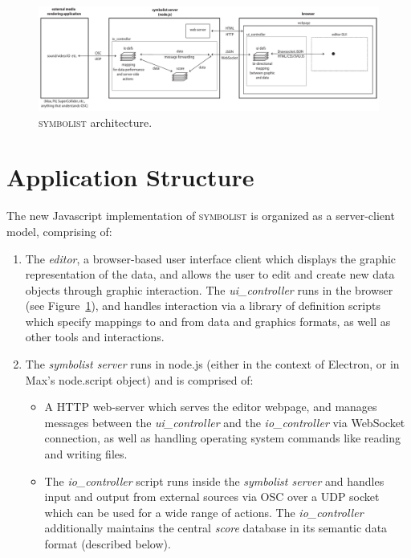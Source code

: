 \documentclass{article}
\def\symbolist{\textsc{symbolist}\xspace}
\def\uicontroller{\textit{ui\_controller}\xspace}
\def\iocontroller{\textit{io\_controller}\xspace}
\begin{document}
%


\begin{figure}[ht!]
\centering
\includegraphics[width=2\columnwidth]{symbolist-architecture2.pdf}
\caption{ \symbolist architecture.
\label{fig:architecture}}
\end{figure}

\section{Application Structure}\label{sec:application_structure}

The new Javascript implementation of \symbolist is organized as a server-client model, comprising of:

\begin{enumerate}\itemsep0pt 
\item The \textit{editor}, a browser-based user interface client which displays the graphic representation of the data, and allows the user to edit and create new data objects through graphic interaction. The \uicontroller runs in the browser (see Figure~\ref{fig:architecture}), and handles interaction via a library of definition scripts which specify mappings to and from data and graphics formats, as well as other tools and interactions.

\item The \textit{symbolist server} runs in node.js (either in the context of Electron, or in Max's node.script object) and is comprised of: 
\begin{itemize}\itemsep0pt 

\item A HTTP web-server which serves the editor webpage, and manages messages between the \uicontroller and the \iocontroller via WebSocket connection, as well as handling operating system commands like reading and writing files.

\item  The \iocontroller script runs inside the \textit{symbolist server} and handles input and output from external sources via OSC over a UDP socket which can be used for a wide range of actions. The \iocontroller additionally maintains the central \textit{score} database in its semantic data format (described below).
\end{itemize}
\end{enumerate}
\end{document}
